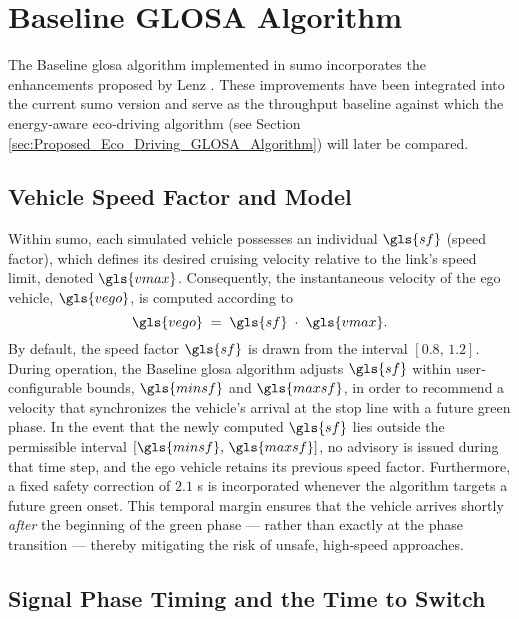 \section{Baseline GLOSA Algorithm}
\label{sec:Baseline_Glosa_Algorithm}

The Baseline \ac{glosa} algorithm implemented in \ac{sumo} incorporates the enhancements proposed by Lenz \cite{Lenz2024}. These improvements have been integrated into the current \ac{sumo} version and serve as the throughput baseline against which the energy‐aware eco‐driving algorithm (see Section \ref{sec:Proposed_Eco_Driving_GLOSA_Algorithm}) will later be compared.

\subsection{Vehicle Speed Factor and Model}
\label{sec:Glosa_Speed_Factor_Model}

Within \ac{sumo}, each simulated vehicle possesses an individual $\gls{sf}$ (speed factor), which defines its desired cruising velocity relative to the link’s speed limit, denoted $\gls{vmax}$. Consequently, the instantaneous velocity of the ego vehicle, $\gls{vego}$, is computed according to
\begin{equation}
\gls{vego} \;=\; \gls{sf} \;\cdot\; \gls{vmax}.
\end{equation}
By default, the speed factor $\gls{sf}$ is drawn from the interval $[0.8,\,1.2]$. During operation, the Baseline \ac{glosa} algorithm adjusts $\gls{sf}$ within user‐configurable bounds, $\gls{minsf}$ and $\gls{maxsf}$, in order to recommend a velocity that synchronizes the vehicle’s arrival at the stop line with a future green phase. In the event that the newly computed $\gls{sf}$ lies outside the permissible interval $[\gls{minsf},\,\gls{maxsf}]$, no advisory is issued during that time step, and the ego vehicle retains its previous speed factor. Furthermore, a fixed safety correction of $2.1$ s is incorporated whenever the algorithm targets a future green onset. This temporal margin ensures that the vehicle arrives shortly \emph{after} the beginning of the green phase --- rather than exactly at the phase transition --- thereby mitigating the risk of unsafe, high‐speed approaches.

\subsection{Signal Phase Timing and the Time to Switch}
\label{sec:Glosa_Signal_Phase_Timing}

